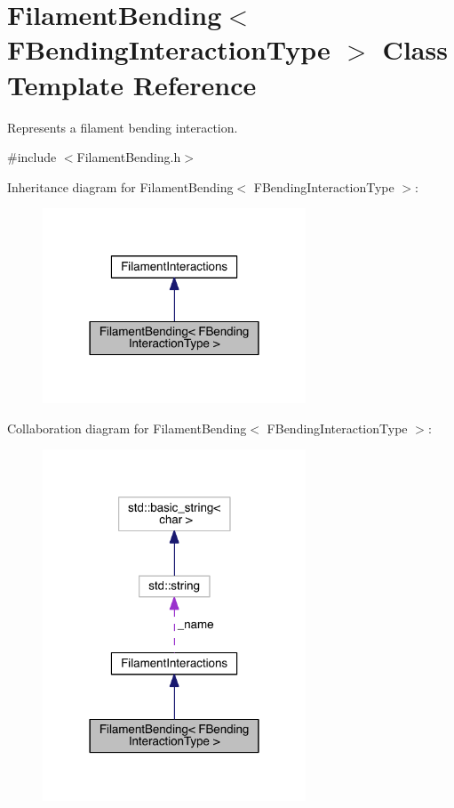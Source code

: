 \hypertarget{classFilamentBending}{\section{Filament\+Bending$<$ F\+Bending\+Interaction\+Type $>$ Class Template Reference}
\label{classFilamentBending}
}


Represents a filament bending interaction.  




{\ttfamily \#include $<$Filament\+Bending.\+h$>$}



Inheritance diagram for Filament\+Bending$<$ F\+Bending\+Interaction\+Type $>$\+:\nopagebreak
\begin{figure}[H]
\begin{center}
\leavevmode
\includegraphics[width=222pt]{classFilamentBending__inherit__graph}
\end{center}
\end{figure}


Collaboration diagram for Filament\+Bending$<$ F\+Bending\+Interaction\+Type $>$\+:\nopagebreak
\begin{figure}[H]
\begin{center}
\leavevmode
\includegraphics[width=222pt]{classFilamentBending__coll__graph}
\end{center}
\end{figure}
